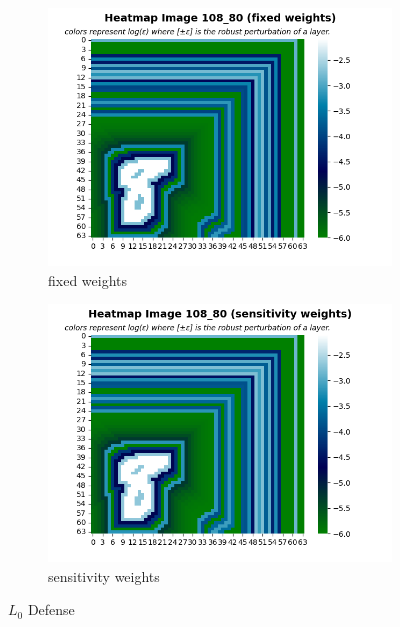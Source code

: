     \begin{figure}
         \centering
         \begin{subfigure}[b]{0.4\textwidth}
             \centering
             \includegraphics[width=\textwidth]{l0_defense_fixed_weights.png}
             \caption{fixed weights}
             \label{sub-fig:L0 defense FW}
         \end{subfigure}
         \hfill
         \begin{subfigure}[b]{0.4\textwidth}
             \centering
             \includegraphics[width=\textwidth]{l0_defense_sensitivity_weights.png}
             \caption{sensitivity weights}
             \label{sub-fig:L0 defense SW}
         \end{subfigure}
         \caption{$L_0$ Defense}
         \label{fig:L0 defense}
    \end{figure}
